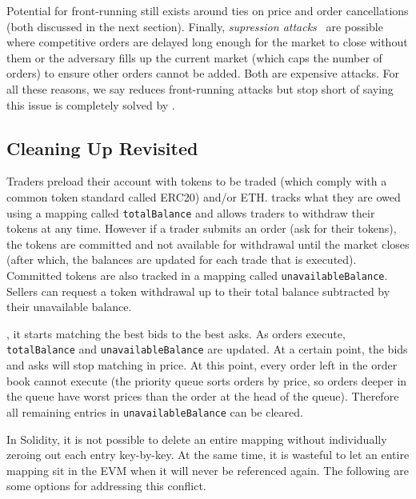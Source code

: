 Potential for front-running still exists around ties on price and order cancellations (both discussed in the next section). Finally, \textit{supression attacks}~\cite{eskandari2019sok} are possible where competitive orders are delayed long enough for the market to close without them or the adversary fills up the current market (which caps the number of orders) to ensure other orders cannot be added. Both are expensive attacks. For all these reasons, we say \cm reduces front-running attacks but stop short of saying this issue is completely solved by \cm. 

\subsection{Cleaning Up Revisited}

 Traders preload their account with tokens to be traded (which comply with a common token standard called ERC20) and/or ETH. \cm tracks what they are owed using a mapping called \texttt{totalBalance} and allows traders to withdraw their tokens at any time. However if a trader submits an order (\ie ask for their tokens), the tokens are committed and not available for withdrawal until the market closes (after which, the balances are updated for each trade that is executed). Committed tokens are also tracked in a mapping called \texttt{unavailableBalance}. Sellers can request a token withdrawal up to their total balance subtracted by their unavailable balance.

, it starts matching the best bids to the best asks. As orders execute, \texttt{totalBalance} and \texttt{unavailableBalance} are updated. At a certain point, the bids and asks will stop matching in price. At this point, every order left in the order book cannot execute (the priority queue sorts orders by price, so orders deeper in the queue have worst prices than the order at the head of the queue). Therefore all remaining entries in \texttt{unavailableBalance} can be cleared.

In Solidity, it is not possible to delete an entire mapping without individually zeroing out each entry key-by-key. At the same time, it is wasteful to let an entire mapping sit in the EVM when it will never be referenced again. The following are some options for addressing this conflict.

